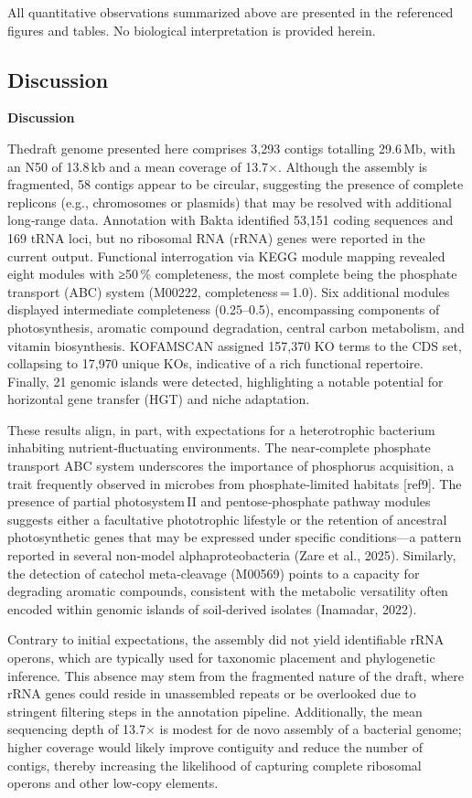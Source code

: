 \documentclass[
  11pt,
]{article}
\begin{document}
All quantitative observations summarized above are presented in the
referenced figures and tables. No biological interpretation is provided
herein.

\subsection{Discussion}\label{discussion}

\textbf{Discussion}

Thedraft genome presented here comprises 3,293 contigs totalling
29.6\,Mb, with an N50 of 13.8\,kb and a mean coverage of 13.7×. Although
the assembly is fragmented, 58 contigs appear to be circular, suggesting
the presence of complete replicons (e.g., chromosomes or plasmids) that
may be resolved with additional long‑range data. Annotation with Bakta
identified 53,151 coding sequences and 169 tRNA loci, but no ribosomal
RNA (rRNA) genes were reported in the current output. Functional
interrogation via KEGG module mapping revealed eight modules with
≥50\,\% completeness, the most complete being the phosphate transport
(ABC) system (M00222, completeness\,=\,1.0). Six additional modules
displayed intermediate completeness (0.25--0.5), encompassing components
of photosynthesis, aromatic compound degradation, central carbon
metabolism, and vitamin biosynthesis. KOFAMSCAN assigned 157,370 KO
terms to the CDS set, collapsing to 17,970 unique KOs, indicative of a
rich functional repertoire. Finally, 21 genomic islands were detected,
highlighting a notable potential for horizontal gene transfer (HGT) and
niche adaptation.

These results align, in part, with expectations for a heterotrophic
bacterium inhabiting nutrient‑fluctuating environments. The
near‑complete phosphate transport ABC system underscores the importance
of phosphorus acquisition, a trait frequently observed in microbes from
phosphate‑limited habitats {[}ref9{]}. The presence of partial
photosystem\,II and pentose‑phosphate pathway modules suggests either a
facultative phototrophic lifestyle or the retention of ancestral
photosynthetic genes that may be expressed under specific conditions---a
pattern reported in several non‑model alphaproteobacteria (Zare et al.,
2025). Similarly, the detection of catechol meta‑cleavage (M00569)
points to a capacity for degrading aromatic compounds, consistent with
the metabolic versatility often encoded within genomic islands of
soil‑derived isolates (Inamadar, 2022).

Contrary to initial expectations, the assembly did not yield
identifiable rRNA operons, which are typically used for taxonomic
placement and phylogenetic inference. This absence may stem from the
fragmented nature of the draft, where rRNA genes could reside in
unassembled repeats or be overlooked due to stringent filtering steps in
the annotation pipeline. Additionally, the mean sequencing depth of
13.7× is modest for de novo assembly of a bacterial genome; higher
coverage would likely improve contiguity and reduce the number of
contigs, thereby increasing the likelihood of capturing complete
ribosomal operons and other low‑copy elements.
\end{document}
